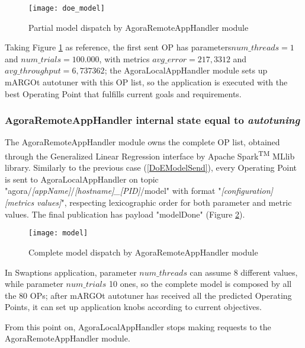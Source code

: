 \begin{figure}[hb]

    \centering
    \texttt{[image: doe\_model]}
    \caption{Partial model dispatch by AgoraRemoteAppHandler module}
    \label{fig:doe_model}
    
\end{figure}

Taking Figure \ref{fig:doe_model} as reference, the first sent OP has parameters\linebreak $num\_threads = 1$ and $num\_trials = 100.000$, with metrics $avg\_error = 217,3312$ and $avg\_throughput = 6,737362$; the AgoraLocalAppHandler module sets up mARGOt autotuner with this OP list, so the application is executed with the best Operating Point that fulfills current goals and requirements.


\subsubsection{AgoraRemoteAppHandler internal state equal to \textit{autotuning}}\label{modelSend}

The AgoraRemoteAppHandler module owns the complete OP list, obtained through the Generalized Linear Regression interface by A\-pach\-e Spark\textsuperscript{TM} MLlib library. Similarly to the previous case (\ref{DoEModelSend}), every Operating Point is sent to AgoraLocalAppHandler on topic "agora\slash{}\textit{[app\-Name]}\slash{}\textit{[host\-name]\_[PID]}\slash{}model" with format "\textit{[configuration] [metrics values]}", respecting lexicographic order for both parameter and metric values. The final publication has payload "modelDone" (Figure \ref{fig:model}).

\begin{figure}[hb]

    \centering
    \texttt{[image: model]}
    \caption{Complete model dispatch by AgoraRemoteAppHandler module}
    \label{fig:model}
    
\end{figure}

In Swaptions application, parameter $num\_threads$ can assume 8 different values, while parameter $num\_trials$ 10 ones, so the complete model is composed by all the 80 OPs; after mARGOt autotuner has received all the predicted Operating Points, it can set up application knobs according to current objectives.

From this point on, AgoraLocalAppHandler stops making requests to the AgoraRemoteAppHandler module.





